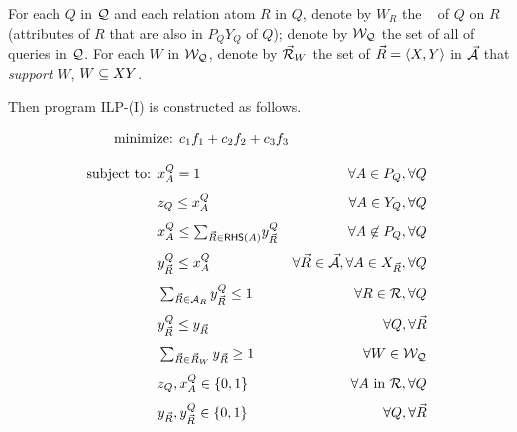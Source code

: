 \vspace{0.36ex}
For each $Q$ in $\mathcal Q$ and each relation atom $R$ in $Q$, denote by
$W_{R}$ the \qcs~\cite{blinkdb} of $Q$ on $R$ (\ie attributes of
$R$ that are also in $P_{Q}Y_{Q}$ of $Q$); denote by $\mathcal{W}_{\mathcal Q}$
the set of all \qcs of queries in $\mathcal Q$. For each \qcs $W$ in
$\mathcal{W}_{\mathcal Q}$, denote by $\vec{{\mathcal R}}_{W}$ the set of \bss $\vec{R}\allowbreak
=\allowbreak \langle X,\allowbreak Y\rangle$ in $\vec{{\mathcal A}}$ that {\em support} $W$, \ie
$W\allowbreak\subseteq\allowbreak XY$. 


\vspace{0.6ex}
Then program ILP-(I) is constructed as follows.

\vspace{-1ex}
\begin{tcolorbox}
  \begin{alignat}{2}
\hspace{-2.6cm}\text{minimize:
} & c_{1}f_{1}+c_{2}f_{2}+c_{3}f_{3} & \hfill
  \end{alignat}
  
  \vspace{-3.3ex}
  
  \begin{alignat}{2}
   \hspace*{-0.15cm}\text{subject to: }&  x_{A}^{Q} = 1 & \forall
    A\in P_{Q}, \forall Q \\[0.8ex] 
    & z_{Q}\leq x_{A}^{Q} & \forall A \in Y_{Q},\forall Q \\[0.8ex]
    & x_{A}^{Q} \leq\textstyle \sum_{\kb{R}\in \RHS(A)}\!y_{\kb{R}}^{Q} &~\forall
    A\not\in P_{Q}, \forall Q \\[0.8ex]
    & y_{\kb{R}}^{Q} \leq x_{A}^{Q} & \forall \kb{R}\in \kb{\A}, \forall A\in X_{\kb{R}}, \forall
    Q\\[0.8ex]
    & \textstyle \sum_{\kb{R}\in \A_{R}} y_{\kb{R}}^{Q} \leq 1 & 
    \forall R\in \R, \forall Q \\[0.8ex]
    & y_{\kb{R}}^{Q} \leq y_{\kb{R}} & \forall Q, \forall \kb{R} \\[0.8ex]
    & \textstyle\sum_{\kb{R}\in \kb{R}_{W}} y_{\kb{R}} \geq 1 & \forall W\in \Wc_{\Q} \\[0.8ex]
    & z_{Q}, x_{A}^{Q} \in \{0, 1\} & \forall
    A\text{ in }\R, \forall Q\\[0.8ex]
    & y_{\kb{R}}, y_{\kb{R}}^{Q} \in \{0, 1\} & \forall Q, \forall
    \kb{R} 
  \end{alignat}
  \end{tcolorbox}

